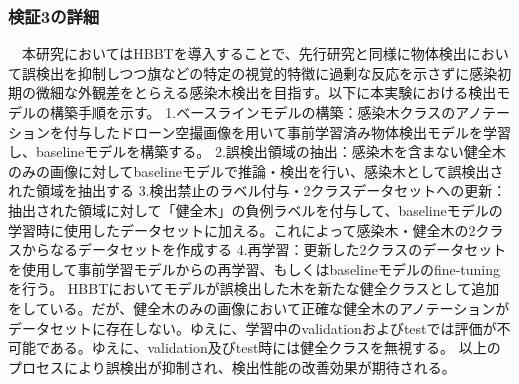 \subsubsection{検証3の詳細}
　本研究においてはHBBTを導入することで、先行研究と同様に物体検出において誤検出を抑制しつつ旗などの特定の視覚的特徴に過剰な反応を示さずに感染初期の微細な外観差をとらえる感染木検出を目指す。以下に本実験における検出モデルの構築手順を示す。
 1.ベースラインモデルの構築：感染木クラスのアノテーションを付与したドローン空撮画像を用いて事前学習済み物体検出モデルを学習し、baselineモデルを構築する。
 2.誤検出領域の抽出：感染木を含まない健全木のみの画像に対してbaselineモデルで推論・検出を行い、感染木として誤検出された領域を抽出する
 3.検出禁止のラベル付与・2クラスデータセットへの更新：抽出された領域に対して「健全木」の負例ラベルを付与して、baselineモデルの学習時に使用したデータセットに加える。これによって感染木・健全木の2クラスからなるデータセットを作成する
 4.再学習：更新した2クラスのデータセットを使用して事前学習モデルからの再学習、もしくはbaselineモデルのfine-tuningを行う。
 HBBTにおいてモデルが誤検出した木を新たな健全クラスとして追加をしている。だが、健全木のみの画像において正確な健全木のアノテーションがデータセットに存在しない。ゆえに、学習中のvalidationおよびtestでは評価が不可能である。ゆえに、validation及びtest時には健全クラスを無視する。
 以上のプロセスにより誤検出が抑制され、検出性能の改善効果が期待される。


 

